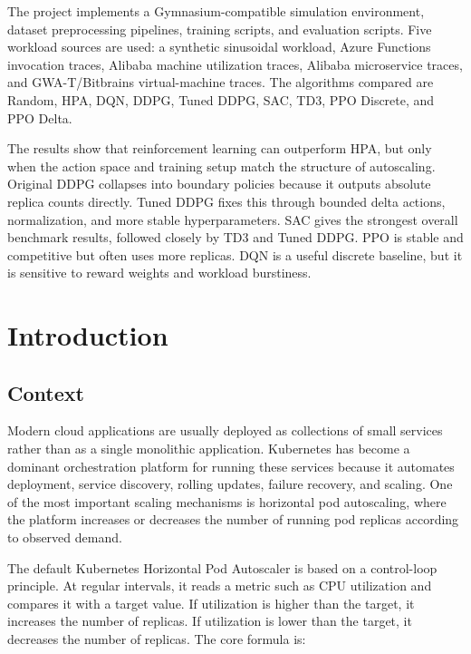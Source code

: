 \documentclass{rapportINPTCLOUD}
\begin{document}
The project implements a Gymnasium-compatible simulation environment, dataset preprocessing pipelines, training scripts, and evaluation scripts. Five workload sources are used: a synthetic sinusoidal workload, Azure Functions invocation traces, Alibaba machine utilization traces, Alibaba microservice traces, and GWA-T/Bitbrains virtual-machine traces. The algorithms compared are Random, HPA, DQN, DDPG, Tuned DDPG, SAC, TD3, PPO Discrete, and PPO Delta.

The results show that reinforcement learning can outperform HPA, but only when the action space and training setup match the structure of autoscaling. Original DDPG collapses into boundary policies because it outputs absolute replica counts directly. Tuned DDPG fixes this through bounded delta actions, normalization, and more stable hyperparameters. SAC gives the strongest overall benchmark results, followed closely by TD3 and Tuned DDPG. PPO is stable and competitive but often uses more replicas. DQN is a useful discrete baseline, but it is sensitive to reward weights and workload burstiness.

\chapter{Introduction}
\label{chap:introduction}

\section{Context}

Modern cloud applications are usually deployed as collections of small services rather than as a single monolithic application. Kubernetes has become a dominant orchestration platform for running these services because it automates deployment, service discovery, rolling updates, failure recovery, and scaling. One of the most important scaling mechanisms is horizontal pod autoscaling, where the platform increases or decreases the number of running pod replicas according to observed demand.

The default Kubernetes Horizontal Pod Autoscaler is based on a control-loop principle. At regular intervals, it reads a metric such as CPU utilization and compares it with a target value. If utilization is higher than the target, it increases the number of replicas. If utilization is lower than the target, it decreases the number of replicas. The core formula is:
\end{document}
